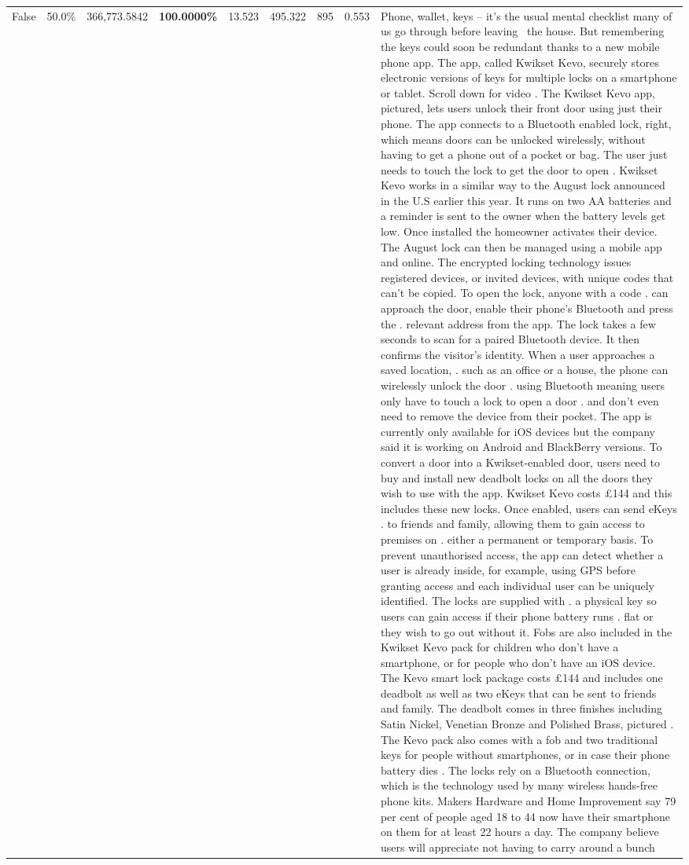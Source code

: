 \begin{table}[H]
\begin{tabular}{lllrlllll}
False & 50.0\% & 366,773.5842 & \bfseries \color{red} 100.0000\% & 13.523 & 495.322 & 895 & 0.553 & Phone, wallet, keys – it’s the usual mental checklist many of us go through before leaving  the house. But remembering the keys could soon be redundant thanks to a new mobile phone app. The app, called Kwikset Kevo, securely stores electronic versions of keys for multiple locks on a smartphone or tablet. Scroll down for video . The Kwikset Kevo app, pictured, lets users unlock their front door using just their phone. The app connects to a Bluetooth enabled lock, right, which means doors can be unlocked wirelessly, without having to get a phone out of a pocket or bag. The user just needs to touch the lock to get the door to open . Kwikset Kevo works in a similar way to the August lock announced in the U.S earlier this year. It runs on two AA batteries and a reminder is sent to the owner when the battery levels get low. Once installed the homeowner activates their device. The August lock can then be managed using a mobile app and online. The encrypted locking technology issues registered devices, or invited devices, with unique codes that can't be copied. To open the lock, anyone with a code . can approach the door, enable their phone's Bluetooth and press the . relevant address from the app. The lock takes a few seconds to scan for a paired Bluetooth device. It then confirms the visitor's identity. When a user approaches a saved location, . such as an office or a house, the phone can wirelessly unlock the door . using Bluetooth meaning users only have to touch a lock to open a door . and don't even need to remove the device from their pocket. The app is currently only available for iOS devices but the company said it is working on Android and BlackBerry versions. To convert a door into a Kwikset-enabled door, users need to buy and install new deadbolt locks on all the doors they wish to use with the app. Kwikset Kevo costs £144 and this includes these new locks. Once enabled, users can send eKeys . to friends and family, allowing them to gain access to premises on . either a permanent or temporary basis. To prevent unauthorised access, the app can detect whether a user is already inside, for example, using GPS before granting access and each individual user can be uniquely identified. The locks are supplied with . a physical key so users can gain access if their phone battery runs . flat or they wish to go out without it. Fobs are also included in the Kwikset Kevo pack for children who don't have a smartphone, or for people who don't have an iOS device. The Kevo smart lock package costs £144 and includes one deadbolt as well as two eKeys that can be sent to friends and family. The deadbolt comes in three finishes including Satin Nickel, Venetian Bronze and Polished Brass, pictured . The Kevo pack also comes with a fob and two traditional keys for people without smartphones, or in case their phone battery dies . The locks rely on a Bluetooth connection, which is the technology used by many wireless hands-free phone kits. Makers Hardware and Home Improvement say 79 per cent of people aged 18 to 44 now have their smartphone on them for at least 22 hours a day. The company believe users will appreciate not having to carry around a bunch 
\end{tabular}
\end{table}
